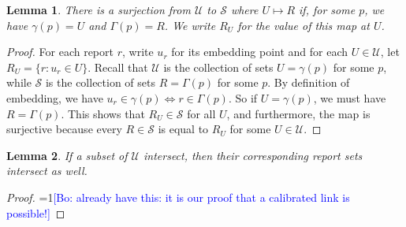 \documentclass{article}
\newcommand{\Comments}{1}
\newcommand{\mynote}[2]{\ifnum\Comments=1\textcolor{#1}{#2}\fi}
\newcommand{\bo}[1]{\mynote{blue}{[Bo: #1]}}
\newtheorem{lemma}{Lemma}
\begin{document}
\begin{lemma} \label{lemma:U-surject}
  There is a surjection from $\mathcal{U}$ to $\mathcal{S}$ where $U \mapsto R$ if, for some $p$, we have $\gamma(p) = U$ and $\Gamma(p) = R$.
  We write $R_U$ for the value of this map at $U$.
\end{lemma}
\begin{proof}
  For each report $r$, write $u_r$ for its embedding point and for each $U \in \mathcal{U}$, let $R_U = \{r : u_r \in U\}$.
  Recall that $\mathcal{U}$ is the collection of sets $U = \gamma(p)$ for some $p$, while $\mathcal{S}$ is the collection of sets $R = \Gamma(p)$ for some $p$.
  By definition of embedding, we have $u_r \in \gamma(p) \iff r \in \Gamma(p)$.
  So if $U = \gamma(p)$, we must have $R = \Gamma(p)$.
  This shows that $R_U \in \mathcal{S}$ for all $U$, and furthermore, the map is surjective because every $R \in \mathcal{S}$ is equal to $R_U$ for some $U \in \mathcal{U}$.
\end{proof}

\begin{lemma} \label{lemma:calibrated-pos}
  If a subset of $\mathcal{U}$ intersect, then their corresponding report sets intersect as well.
\end{lemma}
\begin{proof}
  \bo{already have this: it is our proof that a calibrated link is possible!}
\end{proof}

%
\end{document}
